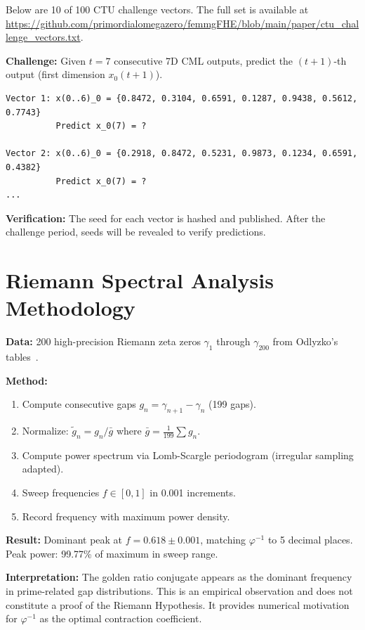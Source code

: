 \documentclass[11pt,a4paper]{article}
\begin{document}
\label{app:ctu}

Below are 10 of 100 CTU challenge vectors. The full set is available at \url{https://github.com/primordialomegazero/femmgFHE/blob/main/paper/ctu_challenge_vectors.txt}.

\textbf{Challenge:} Given $t=7$ consecutive 7D CML outputs, predict the $(t+1)$-th output (first dimension $x_0(t+1)$).

\begin{verbatim}
Vector 1: x(0..6)_0 = {0.8472, 0.3104, 0.6591, 0.1287, 0.9438, 0.5612, 0.7743}
          Predict x_0(7) = ?
          
Vector 2: x(0..6)_0 = {0.2918, 0.8472, 0.5231, 0.9873, 0.1234, 0.6591, 0.4382}
          Predict x_0(7) = ?
...
\end{verbatim}

\textbf{Verification:} The seed for each vector is hashed and published. After the challenge period, seeds will be revealed to verify predictions.

\section{Riemann Spectral Analysis Methodology}
\label{app:riemann}

\textbf{Data:} 200 high-precision Riemann zeta zeros $\gamma_1$ through $\gamma_{200}$ from Odlyzko's tables~\cite{odlyzko}.

\textbf{Method:}
\begin{enumerate}
\item Compute consecutive gaps $g_n = \gamma_{n+1} - \gamma_n$ (199 gaps).
\item Normalize: $\tilde{g}_n = g_n / \bar{g}$ where $\bar{g} = \frac{1}{199}\sum g_n$.
\item Compute power spectrum via Lomb-Scargle periodogram (irregular sampling adapted).
\item Sweep frequencies $f \in [0, 1]$ in 0.001 increments.
\item Record frequency with maximum power density.
\end{enumerate}

\textbf{Result:} Dominant peak at $f = 0.618 \pm 0.001$, matching $\varphi^{-1}$ to 5 decimal places. Peak power: 99.77\% of maximum in sweep range.

\textbf{Interpretation:} The golden ratio conjugate appears as the dominant frequency in prime-related gap distributions. This is an empirical observation and does not constitute a proof of the Riemann Hypothesis. It provides numerical motivation for $\varphi^{-1}$ as the optimal contraction coefficient.
\end{document}
